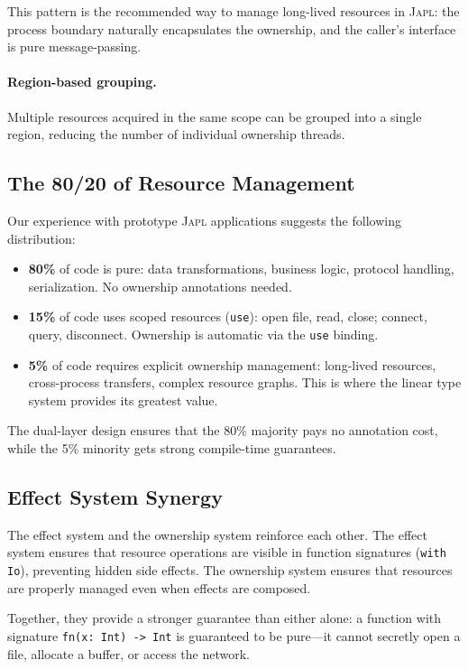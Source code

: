 \documentclass[11pt]{article}
\newcommand{\JAPL}{\textsc{Japl}}
\begin{document}
This pattern is the recommended way to manage long-lived resources
in \JAPL{}: the process boundary naturally encapsulates the
ownership, and the caller's interface is pure message-passing.

\paragraph{Region-based grouping.}
Multiple resources acquired in the same scope can be grouped into a
single region, reducing the number of individual ownership threads.

\subsection{The 80/20 of Resource Management}

Our experience with prototype \JAPL{} applications suggests the
following distribution:

\begin{itemize}
  \item \textbf{80\%} of code is pure: data transformations, business
        logic, protocol handling, serialization.  No ownership
        annotations needed.
  \item \textbf{15\%} of code uses scoped resources (\texttt{use}):
        open file, read, close; connect, query, disconnect.  Ownership
        is automatic via the \texttt{use} binding.
  \item \textbf{5\%} of code requires explicit ownership management:
        long-lived resources, cross-process transfers, complex
        resource graphs.  This is where the linear type system
        provides its greatest value.
\end{itemize}

The dual-layer design ensures that the 80\% majority pays no
annotation cost, while the 5\% minority gets strong compile-time
guarantees.

\subsection{Effect System Synergy}

The effect system and the ownership system reinforce each other.  The
effect system ensures that resource operations are visible in function
signatures (\texttt{with Io}), preventing hidden side effects.  The
ownership system ensures that resources are properly managed even when
effects are composed.

Together, they provide a stronger guarantee than either alone: a
function with signature \texttt{fn(x: Int) -> Int} is guaranteed to
be pure---it cannot secretly open a file, allocate a buffer, or
access the network.
\end{document}
